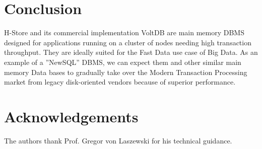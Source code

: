 \documentclass[9pt,twocolumn,twoside]{styles/osajnl}
\begin{document}
\section{Conclusion}
H-Store and its commercial implementation VoltDB are main memory DBMS designed for applications running on a cluster of nodes needing high transaction throughput. They are ideally suited for the Fast Data use case of Big Data. As an example of a ”NewSQL” DBMS, we
can expect them and other similar main memory Data bases to gradually take over the Modern Transaction Processing market from legacy disk-oriented vendors
because of superior performance.

\section*{Acknowledgements}

The authors thank Prof. Gregor von Laszewski for his technical guidance.


\end{document}
